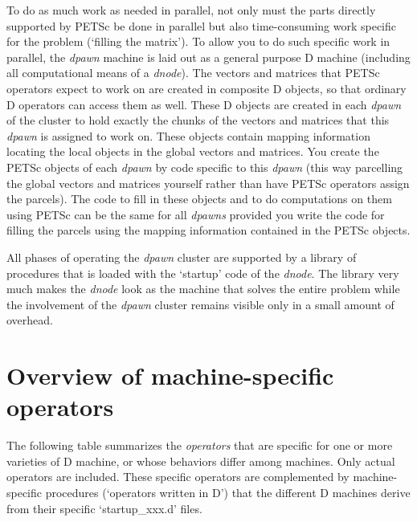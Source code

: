 To do as much work as needed in parallel, not only must the parts directly supported by PETSc be done in parallel but also time-consuming work specific for the problem (`filling the matrix'). To allow you to do such specific work in parallel, the \emph{dpawn} machine is laid out as a general purpose D machine (including all computational means of a \emph{dnode}). The vectors and matrices that PETSc operators expect to work on are created in composite D objects, so that ordinary D operators can access them as well. These D objects are created in each \emph{dpawn} of the cluster to hold exactly the chunks of the vectors and matrices that this \emph{dpawn} is assigned to work on. These objects contain mapping information locating the local objects in the global vectors and matrices. You create the PETSc objects of each \emph{dpawn} by code specific to this \emph{dpawn} (this way parcelling the global vectors and matrices yourself rather than have PETSc operators assign the parcels). The code to fill in these objects and to do computations on them using PETSc can be the same for all \emph{dpawns} provided you write the code for filling the parcels using the mapping information contained in the PETSc objects.

 All phases of operating the \emph{dpawn} cluster are supported by a library of procedures that is loaded with the `startup' code of the \emph{dnode}. The library very much makes the \emph{dnode} look as the machine that solves the entire problem while the involvement of the \emph{dpawn} cluster remains visible only in a small amount of overhead.



\newpage

\section{Overview of machine-specific operators}

The following table summarizes the \emph{operators} that are specific for one or more varieties of D machine, or whose behaviors differ among machines. Only actual operators are included. These specific operators are complemented by machine-specific procedures (`operators written in D') that the different D machines derive from their specific `startup\_xxx.d' files.\\

